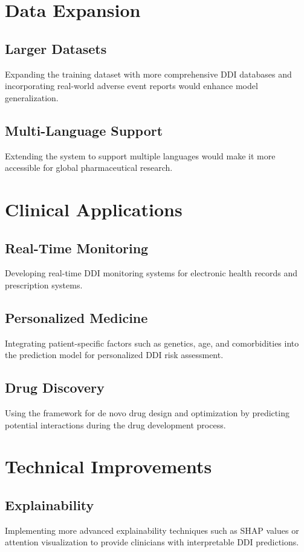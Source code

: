 \documentclass[12pt,a4paper,oneside]{report}
\begin{document}
\section{Data Expansion}

\subsection{Larger Datasets}
Expanding the training dataset with more comprehensive DDI databases and incorporating real-world adverse event reports would enhance model generalization.

\subsection{Multi-Language Support}
Extending the system to support multiple languages would make it more accessible for global pharmaceutical research.

\section{Clinical Applications}

\subsection{Real-Time Monitoring}
Developing real-time DDI monitoring systems for electronic health records and prescription systems.

\subsection{Personalized Medicine}
Integrating patient-specific factors such as genetics, age, and comorbidities into the prediction model for personalized DDI risk assessment.

\subsection{Drug Discovery}
Using the framework for de novo drug design and optimization by predicting potential interactions during the drug development process.

\section{Technical Improvements}

\subsection{Explainability}
Implementing more advanced explainability techniques such as SHAP values or attention visualization to provide clinicians with interpretable DDI predictions.
\end{document}

